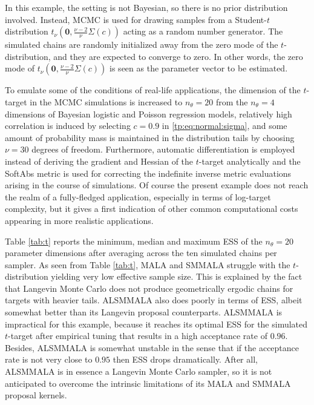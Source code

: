 \documentclass[twoside,11pt]{article}
\begin{document}
In this example, the setting is not Bayesian, so there is no prior distribution involved. Instead, MCMC is used for drawing
samples from a Student-$t$ distribution $t_{\nu}(\mathbf{0},\frac{\nu-2}{\nu}\Sigma(c))$ acting as a random number generator. 
The simulated chains are randomly initialized away from the zero mode of the $t$-distribution, and they are expected to 
converge to zero. In other words, the zero mode of $t_{\nu}(\mathbf{0},\frac{\nu-2}{\nu}\Sigma(c))$ is seen as the parameter 
vector to be estimated.

To emulate some of the conditions of real-life applications, the dimension of the $t$-target in the MCMC simulations is 
increased to $n_{\theta}=20$ from the $n_{\theta}=4$ dimensions of Bayesian logistic and Poisson regression models, 
relatively high correlation is induced by selecting $c=0.9$ in \eqref{tp:eq:normal:sigma}, and some amount of probability 
mass is maintained in the distribution tails by choosing $\nu=30$ degrees of freedom. Furthermore, automatic differentiation 
is employed instead of deriving the gradient and Hessian of the $t$-target analytically and the SoftAbs metric is used for 
correcting the indefinite inverse metric evaluations arising in the course of simulations. Of course the present example does
not reach the realm of a fully-fledged application, especially in terms of log-target complexity, but it gives a first
indication of other common computational costs appearing in more realistic applications.

Table \ref{tab:t} reports the minimum, median and maximum ESS of the $n_{\theta}=20$ parameter dimensions after averaging 
across the ten simulated chains per sampler. As seen from Table \ref{tab:t}, MALA and SMMALA struggle with the 
$t$-distribution yielding very low effective sample size. This is explained by the fact that Langevin Monte Carlo does not 
produce geometrically ergodic chains for targets with heavier tails. ALSMMALA also does poorly in terms of ESS, albeit 
somewhat better than its Langevin proposal counterparts. ALSMMALA is impractical for this example, because it reaches its 
optimal ESS for the simulated $t$-target after empirical tuning that results in a high acceptance rate of $0.96$. Besides, 
ALSMMALA is somewhat unstable in the sense that if the acceptance rate is not very close to $0.95$ then ESS drops 
dramatically. After all, ALSMMALA is in essence a Langevin Monte Carlo sampler, so it is not anticipated to overcome the 
intrinsic limitations of its MALA and SMMALA proposal kernels.
\end{document}
